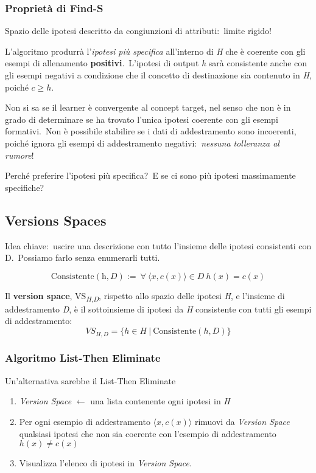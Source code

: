 \subsubsection{Proprietà di Find-S}

Spazio delle ipotesi descritto da congiunzioni di attributi:\ limite rigido!\

L'algoritmo produrrà l'\textit{ipotesi più specifica} all'interno di \textit{H} che è coerente con gli esempi di allenamento \textbf{positivi}.\
L'ipotesi di output \textit{h} sarà consistente anche con gli esempi negativi a condizione che il concetto di destinazione sia contenuto in \textit{H}, poiché $c \geq h$.\

Non si sa se il learner è convergente al concept target, nel senso che non è in grado di determinare se ha trovato l'unica ipotesi coerente con gli esempi formativi.\
Non è possibile stabilire se i dati di addestramento sono incoerenti, poiché ignora gli esempi di addestramento negativi:\ \textit{nessuna tolleranza al rumore}!\

Perché preferire l'ipotesi più specifica?\
E se ci sono più ipotesi massimamente specifiche?

\subsection{Versions Spaces}

Idea chiave:\ uscire una descrizione con tutto l'insieme delle ipotesi consistenti con D.\
Possiamo farlo senza enumerarli tutti.\

\[\mathrm{Consistente}(\textit{h}, \textit{D}):=\ \forall\ \langle x,c(x) \rangle \in D\ h (x) = c (x)\]

\noindent Il \textbf{version space}, VS\textsubscript{\textit{H},\textit{D}}, rispetto allo spazio delle ipotesi \textit{H}, e l'insieme di addestramento \textit{D}, è il sottoinsieme di ipotesi da \textit{H} consistente con tutti gli esempi di addestramento:\
\[
	VS_{H,D} = \{h \in H\ |\ \mathrm{Consistente}(h, D)\}
\]

\subsubsection{Algoritmo List-Then Eliminate}
Un'alternativa sarebbe il List-Then Eliminate
\begin{enumerate}
	\item \textit{Version Space} $\leftarrow$ una lista contenente ogni ipotesi in \textit{H}
	\item Per ogni esempio di addestramento $\langle x,c(x) \rangle$ rimuovi da \textit{Version Space} qualsiasi ipotesi che non sia coerente con l'esempio di addestramento $h(x) \neq c(x)$
	\item Visualizza l'elenco di ipotesi in \textit{Version Space}.
\end{enumerate}

